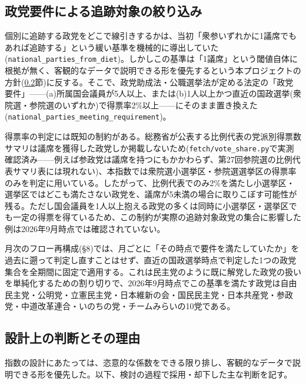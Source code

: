 \documentclass[a4paper,11pt]{ltjsarticle}
\begin{document}
\subsection{政党要件による追跡対象の絞り込み}
\label{sec:party-requirement}

個別に追跡する政党をどこで線引きするかは、当初「衆参いずれかに1議席でもあれば追跡する」という緩い基準を機械的に導出していた(\texttt{national\_parties\_from\_diet})。しかしこの基準は「1議席」という閾値自体に根拠が無く、客観的なデータで説明できる形を優先するという本プロジェクトの方針(\ref{sec:rationale}節)に反する。そこで、政党助成法・公職選挙法が定める法定の「政党要件」——(a)所属国会議員が5人以上、または(b)1人以上かつ直近の国政選挙(衆院選・参院選のいずれか)で得票率2\%以上——にそのまま置き換えた(\texttt{national\_parties\_meeting\_requirement})。

得票率の判定には既知の制約がある。総務省が公表する比例代表の党派別得票数サマリは議席を獲得した政党しか掲載しないため(\texttt{fetch/vote\_share.py}で実測確認済み——例えば参政党は議席を持つにもかかわらず、第27回参院選の比例代表サマリ表には現れない)、本指数では衆院選小選挙区・参院選選挙区の得票率のみを判定に用いている。したがって、比例代表でのみ2\%を満たし小選挙区・選挙区ではどこも満たさない政党を、議席が5未満の場合に取りこぼす可能性が残る。ただし国会議員を1人以上抱える政党の多くは同時に小選挙区・選挙区でも一定の得票を得ているため、この制約が実際の追跡対象政党の集合に影響した例は2026年9月時点では確認されていない。

月次のフロー再構成(\S8)では、月ごとに「その時点で要件を満たしていたか」を過去に遡って判定し直すことはせず、直近の国政選挙時点で判定した1つの政党集合を全期間に固定で適用する。これは民主党のように既に解党した政党の扱いを単純化するための割り切りで、2026年9月時点でこの基準を満たす政党は自由民主党・公明党・立憲民主党・日本維新の会・国民民主党・日本共産党・参政党・中道改革連合・いのちの党・チームみらいの10党である。

\subsection{設計上の判断とその理由}
\label{sec:rationale}

指数の設計にあたっては、恣意的な係数をできる限り排し、客観的なデータで説明できる形を優先した。以下、検討の過程で採用・却下した主な判断を記す。
\end{document}
